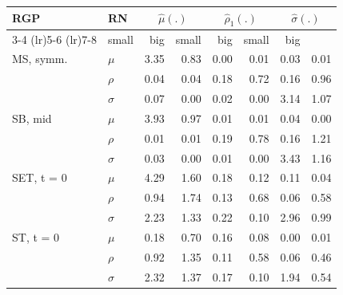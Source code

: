 \begin{table}[t]
\fontsize{12.0pt}{14.0pt}\selectfont
\begin{tabular*}{\linewidth}{@{\extracolsep{\fill}}l|l|rrrrrr}
\toprule
RGP & RN & \multicolumn{2}{c}{$\hat{\mu}(.)$} & \multicolumn{2}{c}{$\hat{\rho}_1(.)$} & \multicolumn{2}{c}{$\hat{\sigma}(.)$} \\ 
\cmidrule(lr){3-4} \cmidrule(lr){5-6} \cmidrule(lr){7-8}
\multicolumn{2}{c}{} & small & big & small & big & small & big \\ 
\midrule\addlinespace[2.5pt]
MS, symm. & $\mu$ & 3.35 & 0.83 & 0.00 & 0.01 & 0.03 & 0.01 \\ 
 & $\rho$ & 0.04 & 0.04 & 0.18 & 0.72 & 0.16 & 0.96 \\ 
 & $\sigma$ & 0.07 & 0.00 & 0.02 & 0.00 & 3.14 & 1.07 \\ 
SB, mid & $\mu$ & 3.93 & 0.97 & 0.01 & 0.01 & 0.04 & 0.00 \\ 
 & $\rho$ & 0.01 & 0.01 & 0.19 & 0.78 & 0.16 & 1.21 \\ 
 & $\sigma$ & 0.03 & 0.00 & 0.01 & 0.00 & 3.43 & 1.16 \\ 
SET, t = 0 & $\mu$ & 4.29 & 1.60 & 0.18 & 0.12 & 0.11 & 0.04 \\ 
 & $\rho$ & 0.94 & 1.74 & 0.13 & 0.68 & 0.06 & 0.58 \\ 
 & $\sigma$ & 2.23 & 1.33 & 0.22 & 0.10 & 2.96 & 0.99 \\ 
ST, t = 0 & $\mu$ & 0.18 & 0.70 & 0.16 & 0.08 & 0.00 & 0.01 \\ 
 & $\rho$ & 0.92 & 1.35 & 0.11 & 0.58 & 0.06 & 0.46 \\ 
 & $\sigma$ & 2.32 & 1.37 & 0.17 & 0.10 & 1.94 & 0.54 \\ 
\bottomrule
\end{tabular*}
\end{table}

